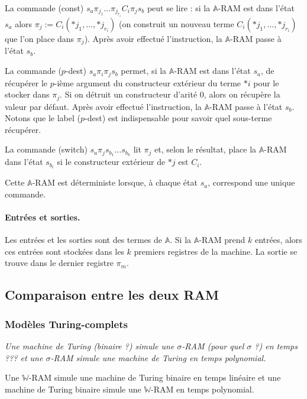 \documentclass{article}
\newcommand{\bbA}{\mathbb{A}}
\begin{document}
\begin{definition}
			La commande (const) $s_a \pi_{j_1} \dots \pi_{j_{r_i}} C_i \pi_j s_b$ peut se lire : si la $\bbA$-RAM est dans l'état $s_a$ alors $\pi_j := C_i\left( *j_1, \dots, *j_{r_i}\right)$ (on construit un nouveau terme $C_i\left( *j_1, \dots, *j_{r_i} \right)$ que l'on place dans $\pi_j$). Après avoir effectué l'instruction, la $\bbA$-RAM passe à l'état $s_b$.

			La commande ($p$-dest) $s_a \pi_i \pi_j s_b$ permet, si la $\bbA$-RAM est dans l'état $s_a$, de récupérer le $p$-ième argument du constructeur extérieur du terme $*i$ pour le stocker dans $\pi_j$. Si on détruit un constructeur d'arité $0$, alors on récupère la valeur par défaut. Après avoir effectué l'instruction, la $\bbA$-RAM passe à l'état $s_b$. Notons que le label ($p$-dest) est indispensable pour savoir quel sous-terme récupérer. 
			
			La commande (switch) $s_a \pi_j s_{b_1} \dots s_{b_k}$ lit $\pi_j$ et, selon le résultat, place la $\bbA$-RAM dans l'état $s_{b_i}$ si le constructeur extérieur de $*j$ est $C_i$.
			
			Cette $\bbA$-RAM est déterministe lorsque, à chaque état $s_a$, correspond une unique commande. 
		\end{definition}
		
		
		\paragraph{Entrées et sorties.}
		Les entrées et les sorties sont des termes de $\bbA$. Si la $\bbA$-RAM prend $k$ entrées, alors ces entrées sont stockées dans les $k$ premiers registres de la machine. La sortie se trouve dans le dernier registre $\pi_m$. 
		
		
		\subsection{Comparaison entre les deux RAM}
		
		
			\subsubsection{Modèles Turing-complets}
		
		
			\begin{theorem} 
				\emph{Une machine de Turing (binaire ?) simule une $\sigma$-RAM (pour quel $\sigma$ ?) en temps ??? et une $\sigma$-RAM simule une machine de Turing en temps polynomial.}
				
				Une $\mathbb{W}$-RAM simule une machine de Turing binaire en temps linéaire et une machine de Turing binaire simule une $\mathbb{W}$-RAM en temps polynomial.
			\end{theorem}
			
\end{document}
